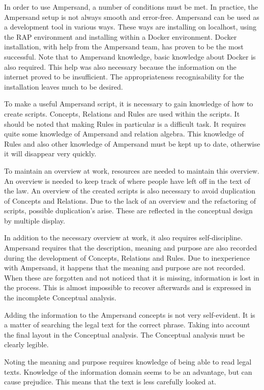 In order to use Ampersand, a number of conditions must be met.
In practice, the Ampersand setup is not always smooth and error-free.
Ampersand can be used as a development tool in various ways.
These ways are installing on localhost, using the RAP environment and installing within a Docker environment.
Docker installation, with help from the Ampersand team, has proven to be the most successful.
Note that to Ampersand knowledge, basic knowledge about Docker is also required.
This help was also necessary because the information on the internet proved to be insufficient.
The appropriateness recognisability for the installation leaves much to be desired.

To make a useful Ampersand script, it is necessary to gain knowledge of how to create scripts.
Concepts, Relations and Rules are used within the scripts.
It should be noted that making Rules in particular is a difficult task.
It requires quite some knowledge of Ampersand and relation algebra.
This knowledge of Rules and also other knowledge of Ampersand must be kept up to date, otherwise it will disappear very quickly.

To maintain an overview at work, resources are needed to maintain this overview.
An overview is needed to keep track of where people have left off in the text of the law.
An overview of the created scripts is also necessary to avoid duplication of Concepts and Relations.
Due to the lack of an overview and the refactoring of scripts, possible duplication's arise.
These are reflected in the conceptual design by multiple display.

In addition to the necessary overview at work, it also requires self-discipline.
Ampersand requires that the description, meaning and purpose are also recorded during the development of Concepts, Relations and Rules.
Due to inexperience with Ampersand, it happens that the meaning and purpose are not recorded.
When these are forgotten and not noticed that it is missing, information is lost in the process.
This is almost impossible to recover afterwards and is expressed in the incomplete Conceptual analysis.

Adding the information to the Ampersand concepts is not very self-evident.
It is a matter of searching the legal text for the correct phrase.
Taking into account the final layout in the Conceptual analysis.
The Conceptual analysis must be clearly legible.

Noting the meaning and purpose requires knowledge of being able to read legal texts.
Knowledge of the information domain seems to be an advantage, but can cause prejudice.
This means that the text is less carefully looked at.

